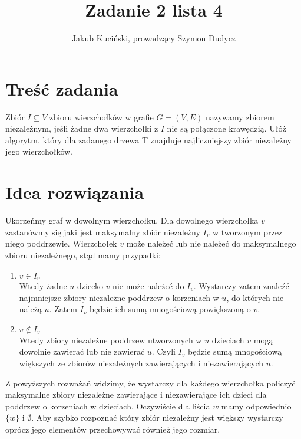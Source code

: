 \documentclass{article}
\title{Zadanie 2 lista 4}
\author{Jakub Kuciński, prowadzący Szymon Dudycz}
\begin{document}
\maketitle

\tableofcontents

\section{Treść zadania}
Zbiór $I\subseteq V$ zbioru wierzchołków w grafie $G=(V, E)$ nazywamy zbiorem niezależnym, jeśli żadne dwa wierzchołki z $I$ nie są połączone krawędzią. Ułóż algorytm, który dla zadanego drzewa T znajduje najliczniejszy zbiór niezależny jego wierzchołków.

\section{Idea rozwiązania}
Ukorzeńmy graf w dowolnym wierzchołku. Dla dowolnego wierzchołka $v$ zastanówmy się jaki jest maksymalny zbiór niezależny $I_v$ w tworzonym przez niego poddrzewie. Wierzchołek $v$ może należeć lub nie należeć do maksymalnego zbioru niezależnego, stąd mamy przypadki:
\begin{enumerate}
    \item $v \in I_v$ \\
    Wtedy żadne $u$ dziecko $v$ nie może należeć do $I_v$. Wystarczy zatem znaleźć najmniejsze zbiory niezależne poddrzew o korzeniach w $u$, do których nie należą $u$. Zatem $I_v$ będzie ich sumą mnogościową powiększoną o $v$.
    \item $v \notin I_v$ \\
    Wtedy zbiory niezależne poddrzew utworzonych w $u$ dzieciach $v$ mogą dowolnie zawierać lub nie zawierać $u$. Czyli $I_v$ będzie sumą mnogościową większych ze zbiorów niezależnych zawierających i niezawierających $u$.
\end{enumerate}
Z powyższych rozważań widzimy, że wystarczy dla każdego wierzchołka policzyć maksymalne zbiory niezależne zawierające i niezawierające ich dzieci dla poddrzew o korzeniach w dzieciach. Oczywiście dla liścia $w$ mamy odpowiednio $\{ w \}$ i $\emptyset$. Aby szybko rozpoznać który zbiór niezależny jest większy wystarczy oprócz jego elementów przechowywać również jego rozmiar.
\end{document}
